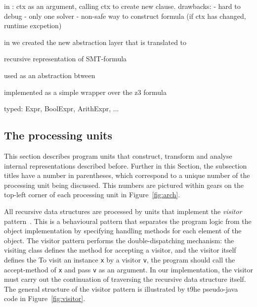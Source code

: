 
in \porthos[1] : ctx as an argument, calling ctx to create new clause. 
drawbacks:
- hard to debug
- only one solver
- non-safe way to construct formula (if ctx has changed, runtime excpetion)

in \porthos[2] we created the new abstraction layer \zformula[] that is translated to 

recursive representation of SMT-formula

used as an abstraction btween

implemented as a simple wrapper over the z3 formula

typed: Expr, BoolExpr, ArithExpr, ...


\subsection{The processing units} %
\label{ch:impl:proc}


This section describes program units that construct, transform and analyse internal representations described before. %
Further in this Section, the subsection titles have a number in parentheses, which correspond to a unique number of the  processing unit being discussed.
This numbers are pictured within gears on the top-left corner of each processing unit in Figure~\ref{fig:arch}.

All recursive data structures are processed by units that implement the \textit{visitor} pattern~\cite{palsberg1998essence}.
This is a behavioural pattern that separates the program logic from the object implementation by specifying handling methods for each element of the object.
The visitor pattern performs the double-dispatching mechanism: the visiting class defines the method for accepting a visitor, and the visitor itself defines the 
To visit an instance \lstinline{x} by a visitor \lstinline{v}, the program should call the accept-method of \lstinline{x} and pass \lstinline{v} as an argument.
In our implementation, the visitor must carry out the continuation of traversing the recursive data structure itself.
The general structure of the visitor pattern is illustrated by t9he pseudo-java code in Figure~\ref{fig:visitor}.

